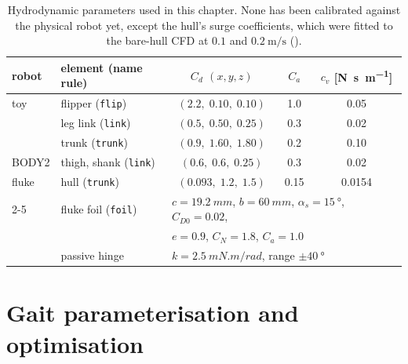 \begin{table}[t]
\centering
\caption{Hydrodynamic parameters used in this chapter. None has been calibrated
against the physical robot yet, except the hull's surge coefficients, which were
fitted to the bare-hull CFD at $0.1$ and $\SI{0.2}{\metre\per\second}$ (\chCFD).}
\label{tab:mj-params}
\footnotesize
\setlength{\tabcolsep}{4pt}
\begin{tabular}{@{}llccc@{}}
\toprule
robot & element (name rule) & $C_d$ $(x,y,z)$ & $C_a$ & $c_v$ [\si{\newton\second\per\metre}] \\
\midrule
toy     & flipper (\texttt{flip})   & $(2.2,\;0.10,\;0.10)$ & 1.0  & 0.05 \\
        & leg link (\texttt{link})  & $(0.5,\;0.50,\;0.25)$ & 0.3  & 0.02 \\
        & trunk (\texttt{trunk})    & $(0.9,\;1.60,\;1.80)$ & 0.2  & 0.10 \\
\midrule
BODY2   & thigh, shank (\texttt{link}) & $(0.6,\;0.6,\;0.25)$ & 0.3 & 0.02 \\
fluke   & hull (\texttt{trunk})     & $(0.093,\;1.2,\;1.5)$ & 0.15 & 0.0154 \\
\cmidrule(l){2-5}
        & fluke foil (\texttt{foil}) & \multicolumn{3}{l}{$c=\SI{19.2}{mm}$, $b=\SI{60}{mm}$, $\alpha_s=\SI{15}{\degree}$, $C_{D0}=0.02$,} \\
        & & \multicolumn{3}{l}{$e=0.9$, $C_N=1.8$, $C_a=1.0$} \\
        & passive hinge & \multicolumn{3}{l}{$k=\SI{2.5}{mN.m/rad}$, range $\pm\SI{40}{\degree}$} \\
\bottomrule
\end{tabular}
\end{table}

\section{Gait parameterisation and optimisation}
\label{sec:mj-gait}

